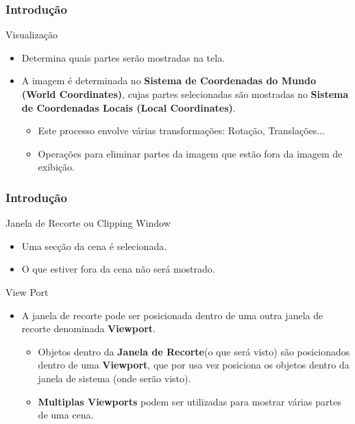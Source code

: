 \documentclass{beamer}
\begin{document}
\begin{frame}
\frametitle{Introdução}


	\begin{block}{Visualização}
		\begin{itemize}
			\item<1-> Determina quais partes serão mostradas na tela.
			\item<2-> A imagem é determinada no \textbf{Sistema de Coordenadas do Mundo (World Coordinates)}, cujas partes selecionadas são mostradas no \textbf{Sistema de Coordenadas Locais (Local Coordinates)}.
			\begin{itemize}
				\item Este processo envolve várias transformações: Rotação, Translações...
				\item Operações para eliminar partes da imagem que estão fora da imagem de exibição.	
			\end{itemize}			 
		\end{itemize}
	\end{block}
	
\end{frame}



\begin{frame}
\frametitle{Introdução}


	\begin{block}{Janela de Recorte ou Clipping Window}
		\begin{itemize}
			\item Uma secção da cena é selecionada.
			\item O que estiver fora da cena não será mostrado.
		\end{itemize}
	\end{block}
	
	\begin{block}{View Port}
		\begin{itemize}
			\item A janela de recorte pode ser posicionada dentro de uma outra janela de recorte denominada \textbf{Viewport}.
			\begin{itemize}
				\item Objetos dentro da \textbf{Janela de Recorte}(o que será visto) são posicionados dentro de uma \textbf{Viewport}, que por usa vez posiciona os objetos dentro da janela de sistema (onde serão visto).
				\item \textbf{Multiplas Viewports} podem ser utilizadas para mostrar várias partes de uma cena.
			\end{itemize}
		\end{itemize}
	\end{block}
	
\end{frame}
\end{document}
